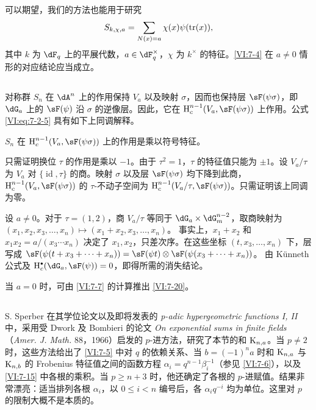 可以期望，我们的方法也能用于研究
\[S_{k,\chi,a}=\sum_{N(x)=a}\chi(x)\psi(\operatorname{tr}(x)),\]
其中 $k$ 为 $\dF_q$ 上的平展代数，$a\in\dF_q^\times$，$\chi$ 为 $k^\times$ 的特征。\ref{VI:7-4} 在 $a\ne0$ 情形的对应结论应当成立。

\subsection{}\label{VI:7-19}
对称群 $S_n$ 在 $\dA^n$ 上的作用保持 $V_a$ 以及映射 $\sigma$，因而也保持层 $\sF(\psi\sigma)$，即 $\dG_a$ 上的 $\sF(\psi)$ 沿 $\sigma$ 的逆像层。因此，它在 $\h_c^{n-1}(V_a,\sF(\psi\sigma))$ 上作用。公式 \eqref{VI:eq:7-2-5} 具有如下上同调解释。

\begin{proposition_}\label{VI:7-20}
$S_n$ 在 $\h_c^{n-1}(V_a,\sF(\psi\sigma))$ 上的作用是乘以符号特征。
\end{proposition_}
只需证明换位 $\tau$ 的作用是乘以 $-1$。由于 $\tau^2=1$，$\tau$ 的特征值只能为 $\pm1$。设 $V_a/\tau$ 为 $V_a$ 对 $\{\operatorname{id},\tau\}$ 的商。映射 $\sigma$ 以及层 $\sF(\psi\sigma)$ 均下降到此商，$\h_c^{n-1}(V_a,\sF(\psi\sigma))$ 的 $\tau$-不动子空间为
$\h_c^{n-1}(V_a/\tau,\sF(\psi\sigma))$。只需证明该上同调为零。

设 $a\ne0$。对于 $\tau=(1,2)$，商 $V_a/\tau$ 等同于 $\dG_a\times\dG_m^{n-2}$，取商映射为
$(x_1,x_2,x_3,\ldots,x_n)\mapsto(x_1+x_2,x_3,\ldots,x_n)$。
事实上，$x_1+x_2$ 和 $x_1x_2=a/(x_3\cdots x_n)$ 决定了 $x_1,x_2$，只差次序。在这些坐标 $(t,x_3,\ldots,x_n)$ 下，层写成
$\sF(\psi(t+x_3+\cdots+x_n))=\sF(\psi t)\otimes\sF(\psi(x_3+\cdots+x_n))$。
由 Künneth 公式及 $\h_c^\bullet(\dG_a,\sF(\psi))=0$，即得所需的消失结论。

当 $a=0$ 时，可由 \ref{VI:7-7} 的计算推出 \ref{VI:7-20}。

\subsection{}\label{VI:7-21}
S. Sperber 在其学位论文以及即将发表的 \emph{p-adic hypergeometric functions I, II} 中，采用受 Dwork 及 Bombieri 的论文 \emph{On exponential sums in finite fields}（\emph{Amer. J. Math.} 88，1966）启发的 $p$-进方法，研究了本节的和 $\textnormal{K}_{n,a}$。当 $p\ne2$ 时，这些方法给出了 \ref{VI:7-5} 中对 $q$ 的依赖关系、当 $b=(-1)^na$ 时和 $\textnormal{K}_{n,a}$ 与 $\textnormal{K}_{n,b}$ 的 Frobenius 特征值之间的函数方程
$\alpha_i=q^{n-1}\beta_i^{-1}$（参见 \ref{VI:7-6}），以及 \ref{VI:7-15} 中各根的乘积。当 $p\ge n+3$ 时，他还确定了各根的 $p$-进赋值。结果非常漂亮：适当排列各根 $\alpha_i$，以 $0\le i<n$ 编号后，各 $\alpha_iq^{-i}$ 均为单位。这里对 $p$ 的限制大概不是本质的。

